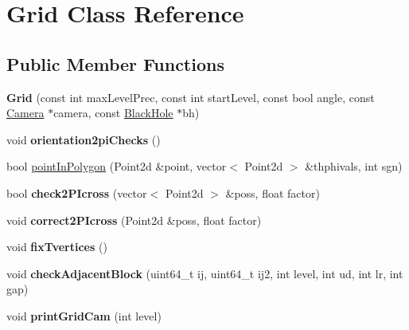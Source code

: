 \hypertarget{class_grid}{}\section{Grid Class Reference}
\label{class_grid}
\subsection*{Public Member Functions}
\begin{DoxyCompactItemize}
\item 
\mbox{\label{class_grid_a83dcaf5537df7b9aaedc08f15baa637c}} 
{\bfseries Grid} (const int max\+Level\+Prec, const int start\+Level, const bool angle, const \mbox{\hyperlink{class_camera}{Camera}} $\ast$camera, const \mbox{\hyperlink{class_black_hole}{Black\+Hole}} $\ast$bh)
\item 
\mbox{\label{class_grid_a9a4f8b27e92e5a61571e9f5da4a549e9}} 
void {\bfseries orientation2pi\+Checks} ()
\item 
bool \mbox{\hyperlink{class_grid_a351334d1546393245bf17660e43c3db0}{point\+In\+Polygon}} (Point2d \&point, vector$<$ Point2d $>$ \&thphivals, int sgn)
\item 
\mbox{\label{class_grid_a87a5e7b1b7b05a53af10792f7a8ef99b}} 
bool {\bfseries check2\+P\+Icross} (vector$<$ Point2d $>$ \&poss, float factor)
\item 
\mbox{\label{class_grid_afd0458d8dd0bbcb59ed354c37eb8fc71}} 
void {\bfseries correct2\+P\+Icross} (Point2d \&poss, float factor)
\item 
\mbox{\label{class_grid_a2e4ea55c72003d29e67e73014389bde2}} 
void {\bfseries fix\+Tvertices} ()
\item 
\mbox{\label{class_grid_a37ce1d9640b0642959efa232ae2361e0}} 
void {\bfseries check\+Adjacent\+Block} (uint64\+\_\+t ij, uint64\+\_\+t ij2, int level, int ud, int lr, int gap)
\item 
\mbox{\label{class_grid_aa2a3fe3a33c5ac1a1b8711f680eb806c}} 
void {\bfseries print\+Grid\+Cam} (int level)
\item 
\mbox{\label{class_grid_a8b9573313486a544889f66011b4b56d0}} 

\end{DoxyCompactItemize}
